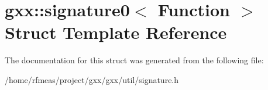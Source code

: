 \hypertarget{structgxx_1_1signature0}{}\section{gxx\+:\+:signature0$<$ Function $>$ Struct Template Reference}
\label{structgxx_1_1signature0}


The documentation for this struct was generated from the following file\+:\begin{DoxyCompactItemize}
\item 
/home/rfmeas/project/gxx/gxx/util/signature.\+h\end{DoxyCompactItemize}
